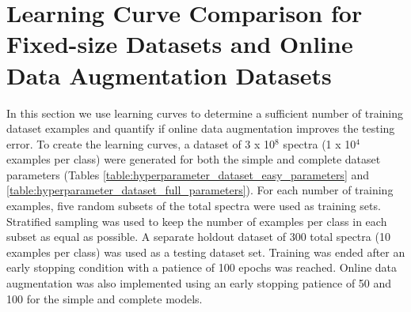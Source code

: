 


\section{Learning Curve Comparison for Fixed-size Datasets and Online Data Augmentation Datasets}

In this section we use learning curves to determine a sufficient number of training dataset examples and quantify if online data augmentation improves the testing error. To create the learning curves, a dataset of 3 x 10$^{8}$ spectra (1 x 10$^{4}$ examples per class) were generated for both the simple and complete dataset parameters (Tables \ref{table:hyperparameter_dataset_easy_parameters} and \ref{table:hyperparameter_dataset_full_parameters}). For each number of training examples, five random subsets of the total spectra were used as training sets. Stratified sampling was used to keep the number of examples per class in each subset as equal as possible. A separate holdout dataset of 300 total spectra (10 examples per class) was used as a testing dataset set. Training was ended after an early stopping condition with a patience of 100 epochs was reached. Online data augmentation was also implemented using an early stopping patience of 50 and 100 for the simple and complete models.

